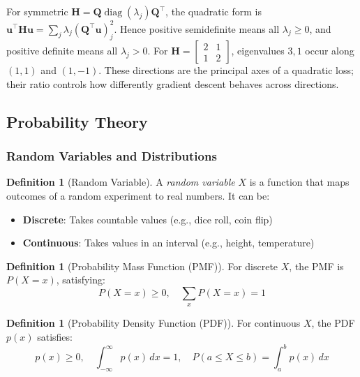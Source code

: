 \documentclass[11pt,twoside]{article}
\numberwithin{equation}{section}
\newcommand{\vect}[1]{\bm{#1}}
\newcommand{\mat}[1]{\bm{#1}}
\theoremstyle{plain}
\theoremstyle{definition}
\newtheorem{definition}[theorem]{Definition}
\theoremstyle{remark}
\begin{document}
For symmetric $\mat H=\mat Q\operatorname{diag}(\lambda_j)\mat Q^\top$, the quadratic form is $\vect u^\top\mat H\vect u=\sum_j\lambda_j(\mat Q^\top\vect u)_j^2$. Hence positive semidefinite means all $\lambda_j\ge0$, and positive definite means all $\lambda_j>0$. For $\mat H=\left[\begin{smallmatrix}2&1\\1&2\end{smallmatrix}\right]$, eigenvalues $3,1$ occur along $(1,1)$ and $(1,-1)$. These directions are the principal axes of a quadratic loss; their ratio controls how differently gradient descent behaves across directions.

\subsection{Probability Theory}

\subsubsection{Random Variables and Distributions}

\begin{definition}[Random Variable]
A \emph{random variable} $X$ is a function that maps outcomes of a random experiment to real numbers. It can be:
\begin{itemize}
\item \textbf{Discrete}: Takes countable values (e.g., dice roll, coin flip)
\item \textbf{Continuous}: Takes values in an interval (e.g., height, temperature)
\end{itemize}
\end{definition}

\begin{definition}[Probability Mass Function (PMF)]
For discrete $X$, the PMF is $P(X = x)$, satisfying:
\[
P(X = x) \geq 0, \quad \sum_x P(X = x) = 1
\]
\end{definition}

\begin{definition}[Probability Density Function (PDF)]
For continuous $X$, the PDF $p(x)$ satisfies:
\[
p(x) \geq 0, \quad \int_{-\infty}^\infty p(x)\,dx = 1, \quad P(a \leq X \leq b) = \int_a^b p(x)\,dx
\]
\end{definition}
\end{document}
